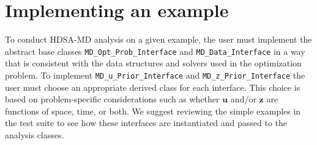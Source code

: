 \documentclass[11pt]{article}
\renewcommand{\u}{\bm{u}}
\newcommand{\z}{\bm{z}}
\newcommand{\0}{\bm{0}}
\begin{document}
\section*{Implementing an example}
To conduct HDSA-MD analysis on a given example, the user must implement the abstract base classes \texttt{MD\_Opt\_Prob\_Interface}
and \texttt{MD\_Data\_Interface} in a way that is consistent with the data structures and solvers used in the optimization problem. To implement \texttt{MD\_u\_Prior\_Interface} and \texttt{MD\_z\_Prior\_Interface} the user must choose an appropriate derived class for each interface. This choice is based on problem-specific considerations such as whether $\u$ and/or $\z$ are functions of space, time, or both. We suggest reviewing the simple examples in the test suite to see how these interfaces are instantiated and passed to the analysis classes.




\end{document}
